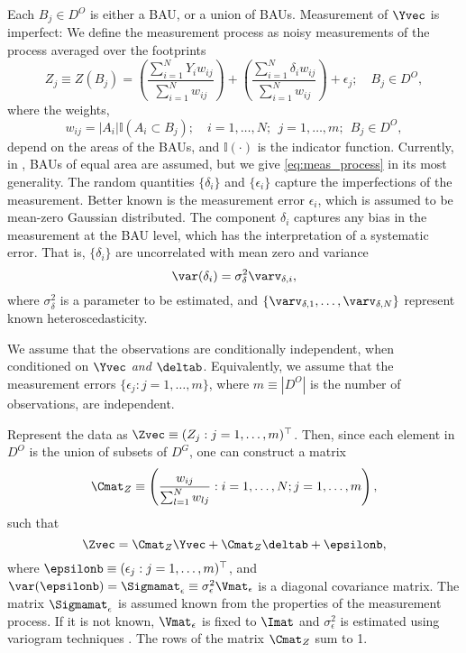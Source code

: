 Each $B_j \in D^O$ is either a BAU, or a union of BAUs. Measurement of $\Yvec$ is imperfect: We define the measurement process as noisy measurements of the process averaged over the footprints
\begin{equation}\label{eq:meas_process}
Z_j \equiv Z(B_j) = \left(\frac{\sum_{i =1}^N Y_i w_{ij}}{\sum_{i=1}^N w_{ij}}\right) + \left(\frac{\sum_{i =1}^N \delta_i w_{ij}}{\sum_{i=1}^N w_{ij}}\right) + \epsilon_j; \quad B_j \in D^O,
\end{equation}
where the weights,
$$ w_{ij} = |A_i|\mathbb{I}(A_i \subset B_j); \quad i = 1,\dots,N;~~j = 1,\dots, m; ~~B_j \in D^O,$$
depend on the areas of the BAUs, and $\mathbb{I}(\cdot)$ is the indicator function. Currently, in , BAUs of equal area are assumed, but we give \eqref{eq:meas_process} in its most generality.   The random quantities $\{\delta_i\}$ and $\{\epsilon_i\}$ capture the imperfections of the measurement. Better known is the measurement error $\epsilon_i$, which is assumed to be mean-zero Gaussian distributed. The component $\delta_i$ captures any bias in the measurement at the BAU level, which has the interpretation of a systematic error. That is, $\{\delta_i\}$ are uncorrelated with mean zero and variance
\begin{equation*}
\var(\delta_i) = \sigma^2_\delta \varv_{\delta,i},
\end{equation*}
where $\sigma^2_\delta$ is a parameter to be estimated, and $\{\varv_{\delta,1},\dots,\varv_{\delta,N}\}$  represent known heteroscedasticity.

We assume that the observations are conditionally independent, when conditioned on $\Yvec$ \emph{and} $\deltab$. Equivalently, we assume that the measurement errors $\{\epsilon_j: j = 1,\dots,m\}$, where $m \equiv |D^O|$ is the number of observations, are independent.

Represent the data as $\Zvec \equiv (Z_j : j = 1,\dots,m)^\top$. Then, since each element in $D^O$ is the union of subsets of $D^G$, one can construct a matrix
$$
\Cmat_Z \equiv \left(\frac{w_{ij}}{\sum_{l=1}^N w_{lj}} : i = 1,\dots,N; j = 1,\dots,m\right),
$$
such that
\begin{equation*}
\Zvec = \Cmat_Z\Yvec + \Cmat_Z\deltab +  \epsilonb,
\end{equation*}
\noindent where $\epsilonb \equiv (\epsilon_j : j = 1,\dots,m)^\top$, and $\var(\epsilonb) = \Sigmamat_\epsilon \equiv \sigma^2_\epsilon\Vmat_\epsilon$ is a diagonal covariance matrix. The matrix $\Sigmamat_\epsilon$ is assumed known from the properties of the measurement process. If it is not known, $\Vmat_\epsilon$ is fixed to $\Imat$ and $\sigma^2_\epsilon$ is estimated using variogram techniques \citep{Kang_2009}. The rows of  the matrix $\Cmat_Z$ sum to 1.

